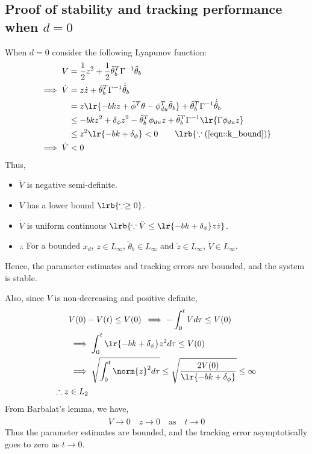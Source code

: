 \subsection{Proof of stability and tracking performance when $d = 0$ \label{apx::dzero_stability}}

When $d = 0$ consider the following Lyapunov function:
\begin{align*}
    V &= \frac{1}{2} z^2 + \frac{1}{2} \tilde{\theta}_b^T \Gamma^{-1} \tilde{\theta}_b\\
    \implies \dot V &= z \dot z + \tilde \theta_b^T \Gamma^{-1} \dot{\hat \theta}_b\\
    &= z \lr{- bk z +  \tilde \phi^T \theta - \phi_{du}^T \tilde \theta_b}+ \tilde \theta_b^T \Gamma^{-1} \dot{\hat \theta}_b\\
    &\leq -bkz^2 + \delta_\phi z^2 - \tilde \theta_b^T \phi_{du} z + \tilde \theta_b^T \Gamma^{-1} \lr{\Gamma \phi_{du} z}\\
    &\leq z^2 \lr{-bk + \delta_\phi} < 0 \qquad \lrb{\because (\ref{eqn::k_bound})}\\
    \implies \dot V &< 0
\end{align*}
Thus,
\begin{itemize}
    \item $\dot V$ is negative semi-definite.
    \item $V$ has a lower bound $ \lrb{\because \geq 0}$.
\item $\dot V$ is uniform continuous $\lrb{\because \ddot V \leq \lr{-bk +
\delta_\phi}z \dot z }$.
    \item $\therefore$ For a bounded $x_d$, $z \in L_\infty$, $\tilde{
    \theta}_b \in L_{\infty}$ and $\dot z \in L_\infty$, $\ddot V \in L_\infty$.
\end{itemize}

Hence, the parameter estimates and tracking errors are bounded, and the system
is stable.

Also, since $V$ is non-decreasing and positive definite,
\begin{align*}
    &V(0) - V(t) \leq V(0) \:
    \implies -\int_0^t V d \tau \leq V(0)\\
    &\implies \int_0^t \lr{-bk + \delta_\phi} z^2 d \tau \leq V(0)\\
    &\implies \sqrt{\int_0^t \norm{z}^2 d \tau } \leq \sqrt{\frac{2 V(0)}{\lr{-bk + \delta_\phi}}} \leq \infty\\
    \therefore z &\in L_2
\end{align*}
From Barbalat's lemma, we have,
\begin{align*}
    \dot V \rightarrow 0 \quad z \rightarrow 0 \quad \text{as} \quad t \rightarrow 0
\end{align*}
Thus the parameter estimates are bounded, and the tracking error asymptotically
goes to zero as  $t \rightarrow 0$.
